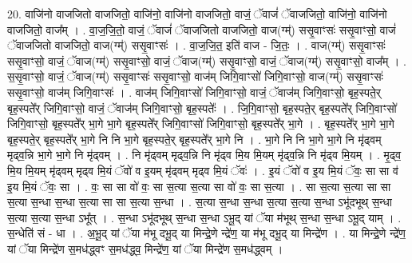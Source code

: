 \documentclass[17pt]{extarticle}
\begin{document}
20. वाजि॑नो वाजजितो वाजजितो॒ वाजि॑नो॒ वाजि॑नो वाजजितो॒ वाजं॒ ॅवाजं॑ ॅवाजजितो॒ वाजि॑नो॒ वाजि॑नो वाजजितो॒ वाज᳚म् । . वा॒ज॒जि॒तो॒ वाजं॒ ॅवाजं॑ ॅवाजजितो वाजजितो॒ वाज(ग्म्॑) ससृ॒वाꣳसः॑ ससृ॒वाꣳसो॒ वाजं॑ ॅवाजजितो वाजजितो॒ वाज(ग्म्॑) ससृ॒वाꣳसः॑ । . वा॒ज॒जि॒त॒ इति॑ वाज - जि॒तः॒ । . वाज(ग्म्॑) ससृ॒वाꣳसः॑ ससृ॒वाꣳसो॒ वाजं॒ ॅवाज(ग्म्॑) ससृ॒वाꣳसो॒ वाजं॒ ॅवाज(ग्म्॑) ससृ॒वाꣳसो॒ वाजं॒ ॅवाज(ग्म्॑) ससृ॒वाꣳसो॒ वाज᳚म् । . स॒सृ॒वाꣳसो॒ वाजं॒ ॅवाज(ग्म्॑) ससृ॒वाꣳसः॑ ससृ॒वाꣳसो॒ वाज॑म् जिगि॒वाꣳसो॑ जिगि॒वाꣳसो॒ वाज(ग्म्॑) ससृ॒वाꣳसः॑ ससृ॒वाꣳसो॒ वाज॑म् जिगि॒वाꣳसः॑ । . वाज॑म् जिगि॒वाꣳसो॑ जिगि॒वाꣳसो॒ वाजं॒ ॅवाज॑म् जिगि॒वाꣳसो॒ बृह॒स्पते॒र् बृह॒स्पते᳚र् जिगि॒वाꣳसो॒ वाजं॒ ॅवाज॑म् जिगि॒वाꣳसो॒ बृह॒स्पतेः᳚ । . जि॒गि॒वाꣳसो॒ बृह॒स्पते॒र् बृह॒स्पते᳚र् जिगि॒वाꣳसो॑ जिगि॒वाꣳसो॒ बृह॒स्पते᳚र् भा॒गे भा॒गे बृह॒स्पते᳚र् जिगि॒वाꣳसो॑ जिगि॒वाꣳसो॒ बृह॒स्पते᳚र् भा॒गे । . बृह॒स्पते᳚र् भा॒गे भा॒गे बृह॒स्पते॒र् बृह॒स्पते᳚र् भा॒गे नि नि भा॒गे बृह॒स्पते॒र् बृह॒स्पते᳚र् भा॒गे नि । . भा॒गे नि नि भा॒गे भा॒गे नि मृ॑ढ्वम् मृढ्व॒न्नि भा॒गे भा॒गे नि मृ॑ढ्वम् । . नि मृ॑ढ्वम् मृढ्व॒न्नि नि मृ॑ढ्व मि॒य मि॒यम् मृ॑ढ्व॒न्नि नि मृ॑ढ्व मि॒यम् । . मृ॒ढ्व॒ मि॒य मि॒यम् मृ॑ढ्वम् मृढ्व मि॒यं ॅवो॑ व इ॒यम् मृ॑ढ्वम् मृढ्व मि॒यं ॅवः॑ । . इ॒यं ॅवो॑ व इ॒य मि॒यं ॅवः॒ सा सा व॑ इ॒य मि॒यं ॅवः॒ सा । . वः॒ सा सा वो॑ वः॒ सा स॒त्या स॒त्या सा वो॑ वः॒ सा स॒त्या । . सा स॒त्या स॒त्या सा सा स॒त्या स॒न्धा स॒न्धा स॒त्या सा सा स॒त्या स॒न्धा । . स॒त्या स॒न्धा स॒न्धा स॒त्या स॒त्या स॒न्धा ऽभू॑दभूथ् स॒न्धा स॒त्या स॒त्या स॒न्धा ऽभू᳚त् । . स॒न्धा ऽभू॑दभूथ् स॒न्धा स॒न्धा ऽभू॒द् यां ॅया म॑भूथ् स॒न्धा स॒न्धा ऽभू॒द् याम् । . स॒न्धेति॑ सं - धा । . अ॒भू॒द् यां ॅया म॑भू दभू॒द् या मिन्द्रे॒णे न्द्रे॑ण॒ या म॑भू दभू॒द् या मिन्द्रे॑ण । . या मिन्द्रे॒णे न्द्रे॑ण॒ यां ॅया मिन्द्रे॑ण स॒मध॑द्ध्वꣳ स॒मध॑द्ध्व॒ मिन्द्रे॑ण॒ यां ॅया मिन्द्रे॑ण स॒मध॑द्ध्वम् । \newline
\end{document}
